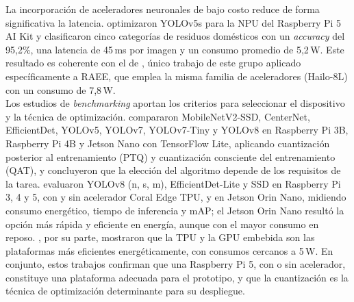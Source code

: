 La incorporación de aceleradores neuronales de bajo costo reduce de forma significativa la latencia. \cite{mutarAIBasedModelHome2026} optimizaron YOLOv5s para la NPU del Raspberry Pi 5 AI Kit y clasificaron cinco categorías de residuos domésticos con un \textit{accuracy} del 95{,}2\%, una latencia de 45\,ms por imagen y un consumo promedio de 5{,}2\,W. Este resultado es coherente con el de \cite{p.sLowPowerEdgeAI2026}, único trabajo de este grupo aplicado específicamente a RAEE, que emplea la misma familia de aceleradores (Hailo-8L) con un consumo de 7{,}8\,W.\\

Los estudios de \textit{benchmarking} aportan los criterios para seleccionar el dispositivo y la técnica de optimización. \cite{zagitovComparativeAnalysisNeural2024} compararon MobileNetV2-SSD, CenterNet, EfficientDet, YOLOv5, YOLOv7, YOLOv7-Tiny y YOLOv8 en Raspberry Pi 3B, Raspberry Pi 4B y Jetson Nano con TensorFlow Lite, aplicando cuantización posterior al entrenamiento (PTQ) y cuantización consciente del entrenamiento (QAT), y concluyeron que la elección del algoritmo depende de los requisitos de la tarea. \cite{alqahtaniBenchmarkingDeepLearning2024} evaluaron YOLOv8 (n, s, m), EfficientDet-Lite y SSD en Raspberry Pi 3, 4 y 5, con y sin acelerador Coral Edge TPU, y en Jetson Orin Nano, midiendo consumo energético, tiempo de inferencia y mAP; el Jetson Orin Nano resultó la opción más rápida y eficiente en energía, aunque con el mayor consumo en reposo. \cite{magalhaesBenchmarkingEdgeComputing2023}, por su parte, mostraron que la TPU y la GPU embebida son las plataformas más eficientes energéticamente, con consumos cercanos a 5\,W. En conjunto, estos trabajos confirman que una Raspberry Pi 5, con o sin acelerador, constituye una plataforma adecuada para el prototipo, y que la cuantización es la técnica de optimización determinante para su despliegue.

